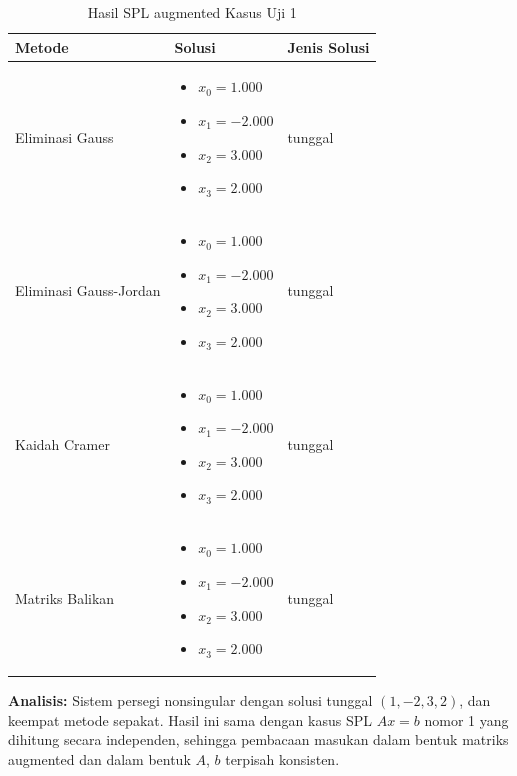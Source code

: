 \documentclass[12pt,a4paper]{report}
\begin{document}
\begin{table}[H]
    \centering
    \caption{Hasil SPL augmented Kasus Uji 1}
    \begin{tabular}{|l|p{5cm}|l|}
        \hline
        \textbf{Metode} & \textbf{Solusi} & \textbf{Jenis Solusi} \\
        \hline
        Eliminasi Gauss & 
        \begin{itemize}
            \item $x_0 = 1.000$
            \item $x_1 = -2.000$
            \item $x_2 = 3.000$
            \item $x_3 = 2.000$
        \end{itemize}
        & tunggal \\
        \hline
        Eliminasi Gauss-Jordan & 
        \begin{itemize}
            \item $x_0 = 1.000$
            \item $x_1 = -2.000$
            \item $x_2 = 3.000$
            \item $x_3 = 2.000$
        \end{itemize}
        & tunggal \\
        \hline
        Kaidah Cramer & 
        \begin{itemize}
            \item $x_0 = 1.000$
            \item $x_1 = -2.000$
            \item $x_2 = 3.000$
            \item $x_3 = 2.000$
        \end{itemize}
        & tunggal \\
        \hline
        Matriks Balikan & 
        \begin{itemize}
            \item $x_0 = 1.000$
            \item $x_1 = -2.000$
            \item $x_2 = 3.000$
            \item $x_3 = 2.000$
        \end{itemize}
        & tunggal \\
        \hline
    \end{tabular}
\end{table}

\textbf{Analisis:} Sistem persegi nonsingular dengan solusi tunggal $(1,-2,3,2)$, dan keempat metode sepakat. Hasil ini sama dengan kasus SPL $Ax=b$ nomor 1 yang dihitung secara independen, sehingga pembacaan masukan dalam bentuk matriks augmented dan dalam bentuk $A$, $b$ terpisah konsisten.
\end{document}
